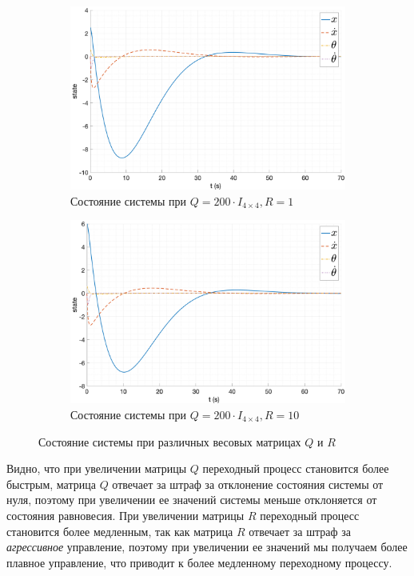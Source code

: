 \begin{figure}[ht!]
\begin{subfigure}[b]{0.45\textwidth}
        \includegraphics[width=\textwidth]{media/plots/LQR/state_8.png}
        \caption{Состояние системы при $Q = 200 \cdot I_{4\times 4}, R = 1$}
    \end{subfigure}
    \begin{subfigure}[b]{0.45\textwidth}
        \centering
        \includegraphics[width=\textwidth]{media/plots/LQR/state_9.png}
        \caption{Состояние системы при $Q = 200 \cdot I_{4\times 4}, R = 10$}
    \end{subfigure}
    \caption{Состояние системы при различных весовых матрицах $Q$ и $R$}
    \label{fig:lqr_controller_qr_state}
\end{figure}    

Видно, что при увеличении матрицы $Q$ переходный процесс становится более быстрым, матрица $Q$ отвечает 
за штраф за отклонение состояния системы от нуля, поэтому при увеличении ее значений системы меньше 
отклоняется от состояния равновесия. При увеличении матрицы $R$ переходный процесс становится более медленным,
так как матрица $R$ отвечает за штраф за \textit{агрессивное} управление, поэтому при увеличении ее значений 
мы получаем более плавное управление, что приводит к более медленному переходному процессу. 

